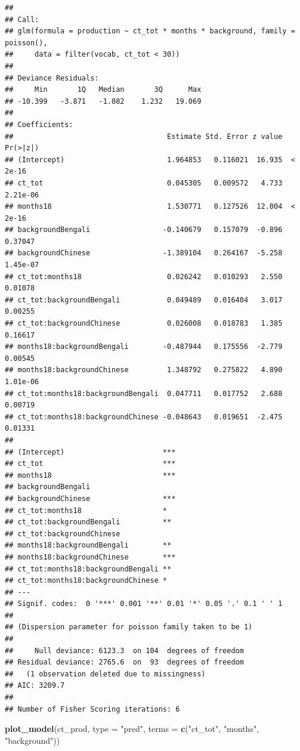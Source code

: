 \documentclass[]{article}
\newenvironment{Shaded}{\begin{snugshade}}{\end{snugshade}}
\newcommand{\DataTypeTok}[1]{\textcolor[rgb]{0.13,0.29,0.53}{#1}}
\newcommand{\KeywordTok}[1]{\textcolor[rgb]{0.13,0.29,0.53}{\textbf{#1}}}
\newcommand{\NormalTok}[1]{#1}
\newcommand{\StringTok}[1]{\textcolor[rgb]{0.31,0.60,0.02}{#1}}
\begin{document}
\begin{verbatim}
## 
## Call:
## glm(formula = production ~ ct_tot * months * background, family = poisson(), 
##     data = filter(vocab, ct_tot < 30))
## 
## Deviance Residuals: 
##     Min       1Q   Median       3Q      Max  
## -10.399   -3.871   -1.082    1.232   19.069  
## 
## Coefficients:
##                                    Estimate Std. Error z value Pr(>|z|)
## (Intercept)                        1.964853   0.116021  16.935  < 2e-16
## ct_tot                             0.045305   0.009572   4.733 2.21e-06
## months18                           1.530771   0.127526  12.004  < 2e-16
## backgroundBengali                 -0.140679   0.157079  -0.896  0.37047
## backgroundChinese                 -1.389104   0.264167  -5.258 1.45e-07
## ct_tot:months18                    0.026242   0.010293   2.550  0.01078
## ct_tot:backgroundBengali           0.049489   0.016404   3.017  0.00255
## ct_tot:backgroundChinese           0.026008   0.018783   1.385  0.16617
## months18:backgroundBengali        -0.487944   0.175556  -2.779  0.00545
## months18:backgroundChinese         1.348792   0.275822   4.890 1.01e-06
## ct_tot:months18:backgroundBengali  0.047711   0.017752   2.688  0.00719
## ct_tot:months18:backgroundChinese -0.048643   0.019651  -2.475  0.01331
##                                      
## (Intercept)                       ***
## ct_tot                            ***
## months18                          ***
## backgroundBengali                    
## backgroundChinese                 ***
## ct_tot:months18                   *  
## ct_tot:backgroundBengali          ** 
## ct_tot:backgroundChinese             
## months18:backgroundBengali        ** 
## months18:backgroundChinese        ***
## ct_tot:months18:backgroundBengali ** 
## ct_tot:months18:backgroundChinese *  
## ---
## Signif. codes:  0 '***' 0.001 '**' 0.01 '*' 0.05 '.' 0.1 ' ' 1
## 
## (Dispersion parameter for poisson family taken to be 1)
## 
##     Null deviance: 6123.3  on 104  degrees of freedom
## Residual deviance: 2765.6  on  93  degrees of freedom
##   (1 observation deleted due to missingness)
## AIC: 3209.7
## 
## Number of Fisher Scoring iterations: 6
\end{verbatim}

\begin{Shaded}
\begin{Highlighting}[]
\KeywordTok{plot_model}\NormalTok{(ct_prod, }\DataTypeTok{type =} \StringTok{"pred"}\NormalTok{, }\DataTypeTok{terms =} \KeywordTok{c}\NormalTok{(}\StringTok{"ct_tot"}\NormalTok{, }\StringTok{"months"}\NormalTok{, }\StringTok{"background"}\NormalTok{))}
\end{Highlighting}
\end{Shaded}
\end{document}
